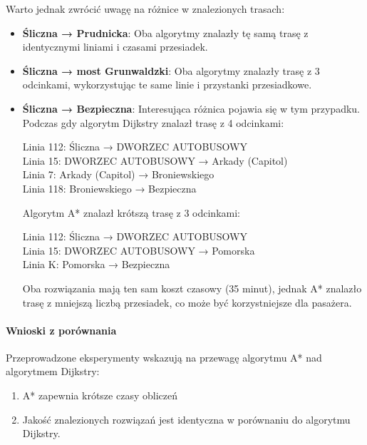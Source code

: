 \documentclass[12pt,a4paper]{article}
\begin{document}
Warto jednak zwrócić uwagę na różnice w znalezionych trasach:

\begin{itemize}
    \item \textbf{Śliczna → Prudnicka}: Oba algorytmy znalazły tę samą trasę z identycznymi liniami i czasami przesiadek.
    
    \item \textbf{Śliczna → most Grunwaldzki}: Oba algorytmy znalazły trasę z 3 odcinkami, wykorzystując te same linie i przystanki przesiadkowe.
    
    \item \textbf{Śliczna → Bezpieczna}: Interesująca różnica pojawia się w tym przypadku. Podczas gdy algorytm Dijkstry znalazł trasę z 4 odcinkami:
    \begin{center}
    Linia 112: Śliczna → DWORZEC AUTOBUSOWY \\
    Linia 15: DWORZEC AUTOBUSOWY → Arkady (Capitol) \\
    Linia 7: Arkady (Capitol) → Broniewskiego \\
    Linia 118: Broniewskiego → Bezpieczna
    \end{center}
    
    Algorytm A* znalazł krótszą trasę z 3 odcinkami:
    \begin{center}
    Linia 112: Śliczna → DWORZEC AUTOBUSOWY \\
    Linia 15: DWORZEC AUTOBUSOWY → Pomorska \\
    Linia K: Pomorska → Bezpieczna
    \end{center}
    
    Oba rozwiązania mają ten sam koszt czasowy (35 minut), jednak A* znalazło trasę z mniejszą liczbą przesiadek, co może być korzystniejsze dla pasażera.
\end{itemize}

\paragraph{Wnioski z porównania}
Przeprowadzone eksperymenty wskazują na przewagę algorytmu A* nad algorytmem Dijkstry:

\begin{enumerate}
    \item A* zapewnia krótsze czasy obliczeń
    \item Jakość znalezionych rozwiązań jest identyczna w porównaniu do algorytmu Dijkstry.
\end{enumerate}
\end{document}
